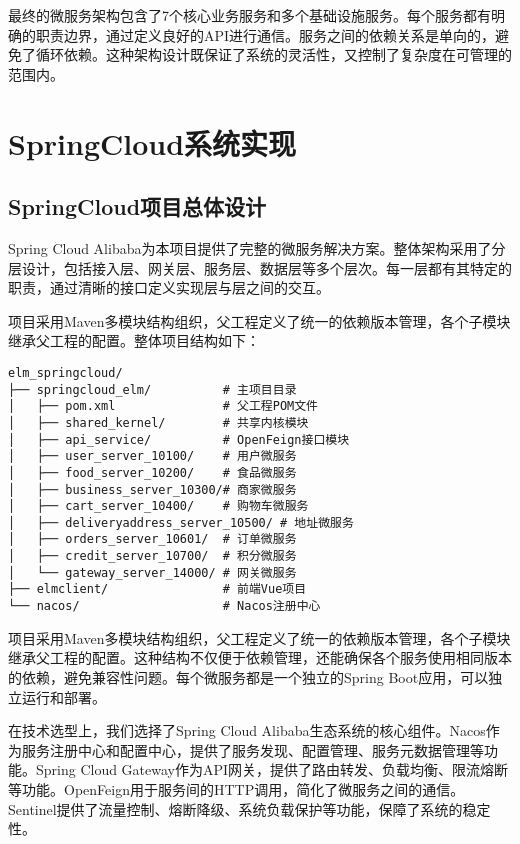 \documentclass[a4paper,12pt]{article}
\begin{document}
最终的微服务架构包含了7个核心业务服务和多个基础设施服务。每个服务都有明确的职责边界，通过定义良好的API进行通信。服务之间的依赖关系是单向的，避免了循环依赖。这种架构设计既保证了系统的灵活性，又控制了复杂度在可管理的范围内。

\section{SpringCloud系统实现}

\subsection{SpringCloud项目总体设计}

Spring Cloud Alibaba为本项目提供了完整的微服务解决方案。整体架构采用了分层设计，包括接入层、网关层、服务层、数据层等多个层次。每一层都有其特定的职责，通过清晰的接口定义实现层与层之间的交互。

项目采用Maven多模块结构组织，父工程定义了统一的依赖版本管理，各个子模块继承父工程的配置。整体项目结构如下：

\begin{lstlisting}[caption=项目模块结构]
elm_springcloud/
├── springcloud_elm/          # 主项目目录
│   ├── pom.xml               # 父工程POM文件
│   ├── shared_kernel/        # 共享内核模块
│   ├── api_service/          # OpenFeign接口模块  
│   ├── user_server_10100/    # 用户微服务
│   ├── food_server_10200/    # 食品微服务
│   ├── business_server_10300/# 商家微服务
│   ├── cart_server_10400/    # 购物车微服务
│   ├── deliveryaddress_server_10500/ # 地址微服务
│   ├── orders_server_10601/  # 订单微服务
│   ├── credit_server_10700/  # 积分微服务
│   └── gateway_server_14000/ # 网关微服务
├── elmclient/                # 前端Vue项目
└── nacos/                    # Nacos注册中心
\end{lstlisting}



项目采用Maven多模块结构组织，父工程定义了统一的依赖版本管理，各个子模块继承父工程的配置。这种结构不仅便于依赖管理，还能确保各个服务使用相同版本的依赖，避免兼容性问题。每个微服务都是一个独立的Spring Boot应用，可以独立运行和部署。

在技术选型上，我们选择了Spring Cloud Alibaba生态系统的核心组件。Nacos作为服务注册中心和配置中心，提供了服务发现、配置管理、服务元数据管理等功能。Spring Cloud Gateway作为API网关，提供了路由转发、负载均衡、限流熔断等功能。OpenFeign用于服务间的HTTP调用，简化了微服务之间的通信。Sentinel提供了流量控制、熔断降级、系统负载保护等功能，保障了系统的稳定性。
\end{document}
